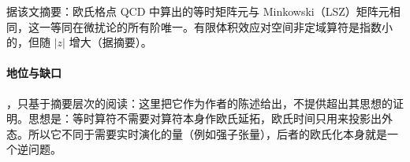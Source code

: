 \begin{proposition}\label{prop:lamet-euclid-minkowski}
据该文摘要\cite{Briceno:2017cpo}：欧氏格点 QCD 中算出的等时矩阵元与 Minkowski（LSZ）矩阵元相同，这一等同在微扰论的所有阶唯一。有限体积效应对空间非定域算符是指数小的，但随 $|z|$ 增大（据\cite{Briceno:2018lfj}摘要）。
\end{proposition}

\paragraph{地位与缺口}
\tagA，只基于摘要层次的阅读：这里把它作为作者的陈述给出，不提供超出其思想的证明。思想是：等时算符不需要对算符本身作欧氏延拓，欧氏时间只用来投影出外态。所以它不同于需要实时演化的量（例如强子张量），后者的欧氏化本身就是一个逆问题。

